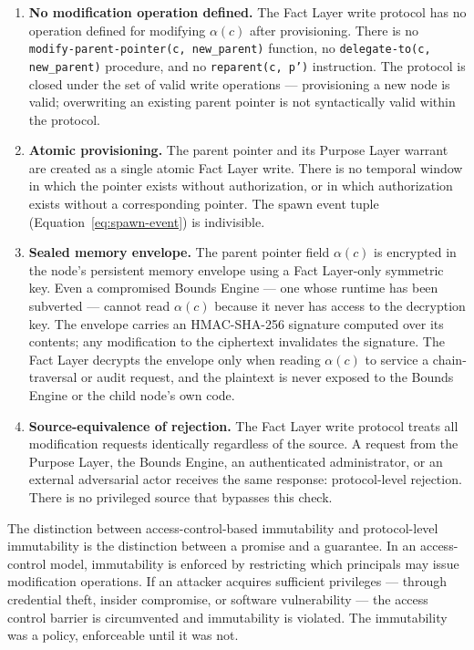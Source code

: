 \begin{enumerate}
    \item[\textbf{W1}] \textbf{No modification operation defined.} The Fact Layer write protocol has no operation defined for modifying $\alpha(c)$ after provisioning. There is no \texttt{modify-parent-pointer(c, new\_parent)} function, no \texttt{delegate-to(c, new\_parent)} procedure, and no \texttt{reparent(c, p')} instruction. The protocol is closed under the set of valid write operations — provisioning a new node is valid; overwriting an existing parent pointer is not syntactically valid within the protocol.
    \item[\textbf{W2}] \textbf{Atomic provisioning.} The parent pointer and its Purpose Layer warrant are created as a single atomic Fact Layer write. There is no temporal window in which the pointer exists without authorization, or in which authorization exists without a corresponding pointer. The spawn event tuple (Equation~\ref{eq:spawn-event}) is indivisible.
    \item[\textbf{W3}] \textbf{Sealed memory envelope.} The parent pointer field $\alpha(c)$ is encrypted in the node's persistent memory envelope using a Fact Layer-only symmetric key. Even a compromised Bounds Engine — one whose runtime has been subverted — cannot read $\alpha(c)$ because it never has access to the decryption key. The envelope carries an HMAC-SHA-256 signature computed over its contents; any modification to the ciphertext invalidates the signature. The Fact Layer decrypts the envelope only when reading $\alpha(c)$ to service a chain-traversal or audit request, and the plaintext is never exposed to the Bounds Engine or the child node's own code.
    \item[\textbf{W4}] \textbf{Source-equivalence of rejection.} The Fact Layer write protocol treats all modification requests identically regardless of the source. A request from the Purpose Layer, the Bounds Engine, an authenticated administrator, or an external adversarial actor receives the same response: protocol-level rejection. There is no privileged source that bypasses this check.
\end{enumerate}

The distinction between access-control-based immutability and protocol-level immutability is the distinction between a promise and a guarantee. In an access-control model, immutability is enforced by restricting which principals may issue modification operations. If an attacker acquires sufficient privileges — through credential theft, insider compromise, or software vulnerability — the access control barrier is circumvented and immutability is violated. The immutability was a policy, enforceable until it was not.

